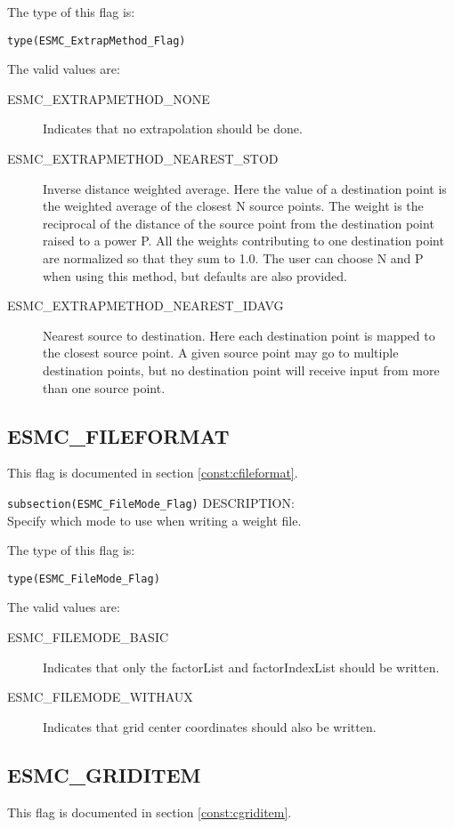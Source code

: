 The type of this flag is:

{\tt type(ESMC\_ExtrapMethod\_Flag)}

The valid values are:
\begin{description}
\item [ESMC\_EXTRAPMETHOD\_NONE]
      Indicates that no extrapolation should be done. 
\item [ESMC\_EXTRAPMETHOD\_NEAREST\_STOD]
      Inverse distance weighted average. 
      Here the value of a destination point is the weighted average of the 
      closest N source points. The weight is the reciprocal of the distance of 
      the source point from the destination point raised to a power P. All the
      weights contributing to one destination point are normalized so that they 
      sum to 1.0. The user can choose N and P when using this method, but 
      defaults are also provided.  
\item [ESMC\_EXTRAPMETHOD\_NEAREST\_IDAVG]
      Nearest source to destination. 
      Here each destination point is mapped to the closest source point. A given 
      source point may go to multiple destination points, but no destination 
      point will receive input from more than one source point. 
\end{description}

\subsection{ESMC\_FILEFORMAT}
This flag is documented in section \ref{const:cfileformat}.

{\tt subsection(ESMC\_FileMode\_Flag)}
\label{opt:cfilemode}
{\sf DESCRIPTION:\\}
Specify which mode to use when writing a weight file.

The type of this flag is:

{\tt type(ESMC\_FileMode\_Flag)}

The valid values are:
\begin{description}
\item [ESMC\_FILEMODE\_BASIC]
      Indicates that only the factorList and factorIndexList should be written. 
\item [ESMC\_FILEMODE\_WITHAUX]
      Indicates that grid center coordinates should also be written.
\end{description}

\subsection{ESMC\_GRIDITEM}
This flag is documented in section \ref{const:cgriditem}.

